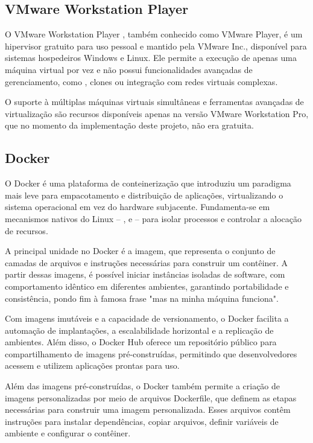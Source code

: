 \subsection{VMware Workstation Player}
\label{subsection:VMware-Player}

O VMware Workstation Player \citep{vmwareplayer2025}, também conhecido como VMware Player, é um hipervisor gratuito para uso pessoal e mantido pela VMware Inc., disponível para sistemas hospedeiros Windows e Linux. Ele permite a execução de apenas uma máquina virtual por vez e não possui funcionalidades avançadas de gerenciamento, como , clones ou integração com redes virtuais complexas.

O suporte à múltiplas máquinas virtuais simultâneas e ferramentas avançadas de virtualização são recursos disponíveis apenas na versão VMware Workstation Pro, que no momento da implementação deste projeto, não era gratuita.

\subsection{Docker}
\label{subsection:Docker}

O Docker \citep{docker2025} é uma plataforma de conteinerização que introduziu um paradigma mais leve para empacotamento e distribuição de aplicações, virtualizando o sistema operacional em vez do hardware subjacente. Fundamenta-se em mecanismos nativos do  Linux -- ,  e  -- para isolar processos e controlar a alocação de recursos.

A principal unidade no Docker é a imagem, que representa o conjunto de camadas de arquivos e instruções necessárias para construir um contêiner. A partir dessas imagens, é possível iniciar instâncias isoladas de software, com comportamento idêntico em diferentes ambientes, garantindo portabilidade e consistência, pondo fim à famosa frase "mas na minha máquina funciona".

Com imagens imutáveis e a capacidade de versionamento, o Docker facilita a automação de implantações, a escalabilidade horizontal e a replicação de ambientes. Além disso, o Docker Hub oferece um repositório público para compartilhamento de imagens pré-construídas, permitindo que desenvolvedores acessem e utilizem aplicações prontas para uso.

Além das imagens pré-construídas, o Docker também permite a criação de imagens personalizadas por meio de arquivos Dockerfile, que definem as etapas necessárias para construir uma imagem personalizada. Esses arquivos contêm instruções para instalar dependências, copiar arquivos, definir variáveis de ambiente e configurar o contêiner.

